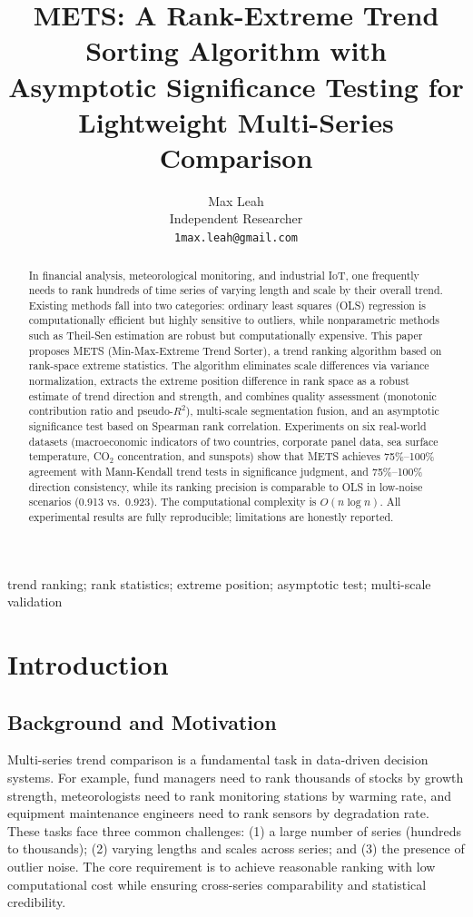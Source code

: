 \documentclass[11pt]{article}
\title{\textbf{METS: A Rank-Extreme Trend Sorting Algorithm with Asymptotic Significance Testing for Lightweight Multi-Series Comparison}}
\author{Max Leah\\Independent Researcher\\\texttt{1max.leah@gmail.com}}
\date{}
\begin{document}
\maketitle

\begin{abstract}
In financial analysis, meteorological monitoring, and industrial IoT, one frequently needs to rank hundreds of time series of varying length and scale by their overall trend. Existing methods fall into two categories: ordinary least squares (OLS) regression is computationally efficient but highly sensitive to outliers, while nonparametric methods such as Theil-Sen estimation are robust but computationally expensive. This paper proposes METS (Min-Max-Extreme Trend Sorter), a trend ranking algorithm based on rank-space extreme statistics. The algorithm eliminates scale differences via variance normalization, extracts the extreme position difference in rank space as a robust estimate of trend direction and strength, and combines quality assessment (monotonic contribution ratio and pseudo-$R^2$), multi-scale segmentation fusion, and an asymptotic significance test based on Spearman rank correlation. Experiments on six real-world datasets (macroeconomic indicators of two countries, corporate panel data, sea surface temperature, CO$_2$ concentration, and sunspots) show that METS achieves 75\%--100\% agreement with Mann-Kendall trend tests in significance judgment, and 75\%--100\% direction consistency, while its ranking precision is comparable to OLS in low-noise scenarios (0.913 vs.\ 0.923). The computational complexity is $O(n \log n)$. All experimental results are fully reproducible; limitations are honestly reported.
\end{abstract}

\begin{keywords}
trend ranking; rank statistics; extreme position; asymptotic test; multi-scale validation
\end{keywords}

\section{Introduction}
\subsection{Background and Motivation}
Multi-series trend comparison is a fundamental task in data-driven decision systems. For example, fund managers need to rank thousands of stocks by growth strength, meteorologists need to rank monitoring stations by warming rate, and equipment maintenance engineers need to rank sensors by degradation rate. These tasks face three common challenges: (1) a large number of series (hundreds to thousands); (2) varying lengths and scales across series; and (3) the presence of outlier noise. The core requirement is to achieve reasonable ranking with low computational cost while ensuring cross-series comparability and statistical credibility.
\end{document}

